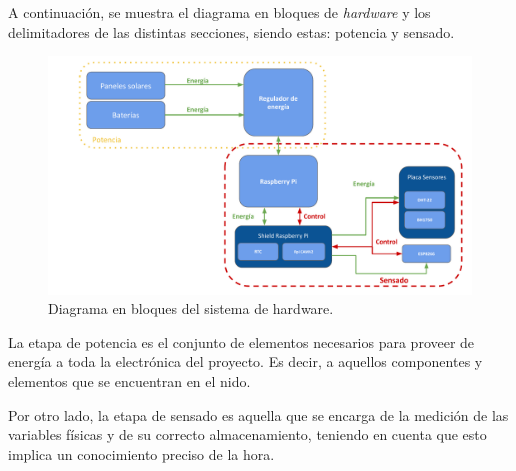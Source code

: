 A continuación, se muestra el diagrama en bloques de \textit{hardware} y los delimitadores de las distintas secciones, siendo estas: potencia y sensado.

\begin{figure}[H]
	\centering
	\includegraphics[width=\textwidth]{ImagenesIngenieria de Detalle/DiagramaHardwareMarcado}		
	\caption{Diagrama en bloques del sistema de hardware.}
	\label{fig:diagrama_hardware}
\end{figure}

La etapa de potencia es el conjunto de elementos necesarios para proveer de energía a toda la electrónica del proyecto. Es decir, a aquellos componentes y elementos que se encuentran en el nido.


Por otro lado, la etapa de sensado es aquella que se encarga de la medición de las variables físicas y de su correcto almacenamiento, teniendo en cuenta que esto implica un conocimiento preciso de la hora.